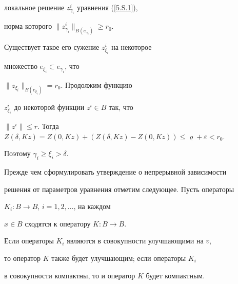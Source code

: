 локальное решение $z_{\gamma_i}^i $ уравнения (\ref{5.S.1}),


норма которого $\|z_{\gamma_i}^i\|_{B(e_{\gamma_i})} \geqslant r_0$.


Существует такое его сужение $z_{\xi_i}^i $ на некоторое


множество $e_{\xi_i}\subset e_{\gamma_i}$, что


$\|z_{\xi_i}\|_{B(e_{\xi_i})}=r_0$. Продолжим функцию


$z_{\xi_i}^i$ до некоторой функции $z^i \in B $ так, что


$\|z^i\|\leqslant r$. Тогда $Z(\delta, K z)=Z(0, K z)+


(Z(\delta, K z)-Z(0, K z)) \leqslant \varrho+\varepsilon< r_0$.


Поэтому $\gamma_i\geqslant\xi_i>\delta$.








Прежде чем сформулировать утверждение о непрерывной зависимости


решения от параметров уравнения отметим следующее. Пусть операторы


$K_{i}:B \to B$, $i=1, 2, \dotsc$, на каждом


$x\in B$ сходятся к оператору $K:B \to B$.


Если операторы $K_{i}$ являются в совокупности улучшающими на $v$,


то оператор $K$ также будет улучшающим; если операторы $K_{i}$


в совокупности компактны, то и оператор $K$ будет компактным.








